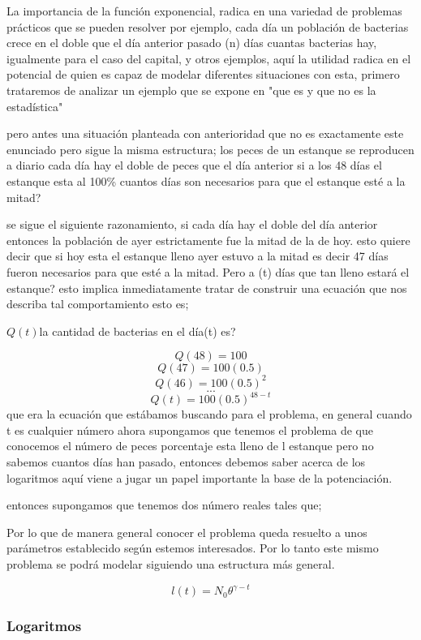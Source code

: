 \documentclass[12pt]{article}
\begin{document}
{La importancia de la función exponencial, radica en una variedad de problemas prácticos que se pueden resolver por ejemplo, cada día un población de bacterias crece en el doble que el día anterior pasado (n) días cuantas bacterias hay, igualmente para el caso del capital, y otros ejemplos, aquí la utilidad radica en el potencial de quien es capaz de modelar diferentes situaciones con esta, primero trataremos de analizar  un ejemplo que se expone en "que es  y que no es la estadística" 

pero antes una situación planteada con anterioridad que no es exactamente este enunciado pero sigue la misma estructura; los peces de un estanque se reproducen a diario cada día hay el doble de peces que el día anterior si a los 48 días el estanque esta al 100\% cuantos días son necesarios para que el estanque esté  a la mitad?

se sigue el siguiente razonamiento, si cada día hay el doble del día anterior entonces la población de ayer estrictamente fue la mitad de la de hoy. esto quiere decir que si hoy esta el estanque lleno ayer estuvo a la mitad es decir 47 días fueron necesarios para que esté a la mitad. Pero a (t) días que tan lleno estará el estanque? esto implica inmediatamente tratar de construir una ecuación que nos describa tal comportamiento esto es;

$Q(t)$la cantidad de bacterias en el día(t) es?

$$Q(48)=100$$ 
$$Q(47)=100(0.5)$$
$$Q(46)=100(0.5)^{2}$$
$$...$$
$$Q(t)=100(0.5)^{48-t}$$
que era la ecuación que estábamos buscando para el problema, en general cuando t es cualquier número ahora supongamos que tenemos el problema de que conocemos el número de peces porcentaje esta lleno de l estanque pero no sabemos cuantos días han pasado, entonces debemos saber acerca de los logaritmos aquí viene a jugar un papel importante la base de la potenciación.


entonces supongamos que tenemos dos número reales tales que;



Por lo que de manera general conocer el problema queda resuelto a unos parámetros establecido según estemos interesados. Por lo tanto este mismo problema se podrá modelar siguiendo una estructura más general.


$$l(t)=N_{0} \theta^{\gamma-t}$$

\subsubsection{Logaritmos} 
 
}
\end{document}
